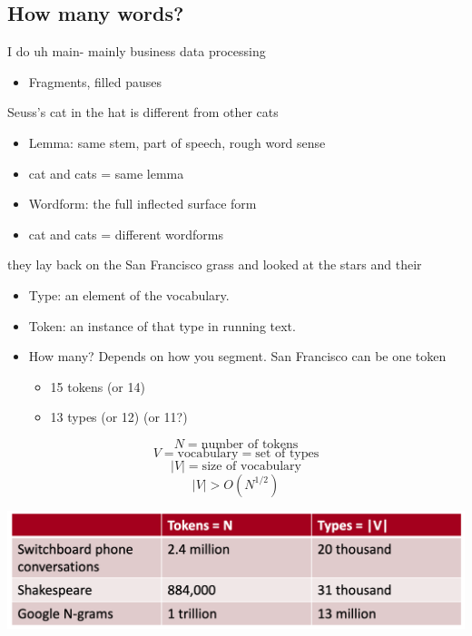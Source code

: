 \documentclass[11pt]{article}
\theoremstyle{definition}
\begin{document}
\subsection{How many words?}
I do uh main- mainly business data processing

\begin{itemize}
  \item Fragments, filled pauses
\end{itemize}

Seuss’s cat in the hat is different from other cats

\begin{itemize}
  \item Lemma: same stem, part of speech, rough word sense
  \item cat and cats = same lemma
  \item Wordform: the full inflected surface form
  \item cat and cats = different wordforms
\end{itemize}

they lay back on the San Francisco grass and looked at the stars and their

\begin{itemize}
  \item Type: an element of the vocabulary.
  \item Token: an instance of that type in running text.
  \item How many? Depends on how you segment. San Francisco can be one token
  \begin{itemize}
    \item 15 tokens (or 14)
    \item 13 types (or 12) (or 11?)
  \end{itemize}
\end{itemize}

\begin{equation}
  N = \text{number of tokens} 
\end{equation}
\begin{equation}
  V = \text{vocabulary} = \text{set of types} 
\end{equation}
\begin{equation}
  |V| = \text{size of vocabulary}
\end{equation}
\begin{equation}
  |V| > O(N^{1/2})
\end{equation}

\includegraphics[width=\textwidth]{1.png}
\end{document}
